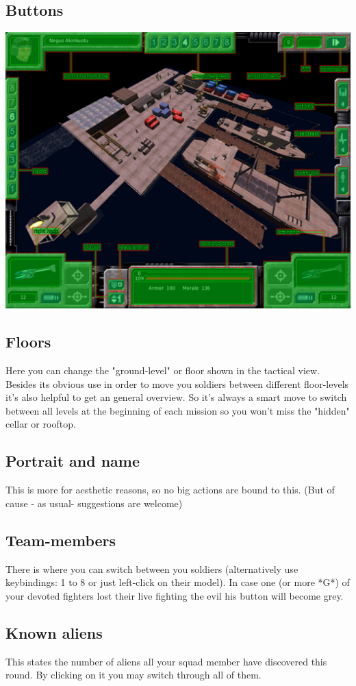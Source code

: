 \subsection{Buttons}
\includegraphics[width=\textwidth]{images/HQ/tactical_overview_finalHQ.jpg}
\subsection{Floors}
Here you can change the "ground-level" or floor shown in the tactical view. Besides its obvious use in order to move you soldiers between different floor-levels it's also helpful to get an general overview. So it's always a smart move to switch between all levels at the beginning of each mission so you won't miss the "hidden" cellar or rooftop.
\subsection{Portrait and name}
This is more for aesthetic reasons, so no big actions are bound to this. (But of cause - as usual- suggestions are welcome)
\subsection{Team-members}
There is where you can switch between you soldiers (alternatively use keybindings: 1 to 8 or just left-click on their model). In case one (or more *G*) of your devoted fighters lost their live fighting the evil his button will become grey.
\subsection{Known aliens}
This states the number of aliens all your squad member have discovered this round. By clicking on it you may switch through all of them.
